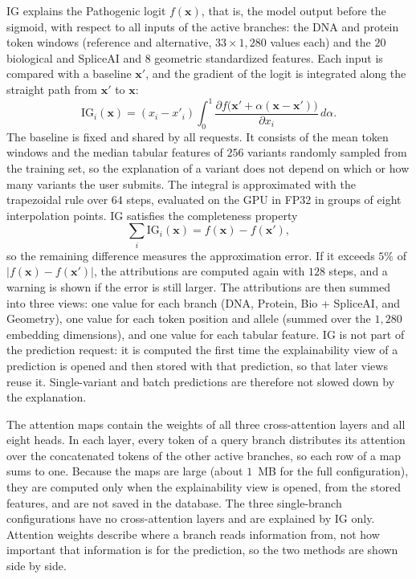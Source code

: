 IG explains the Pathogenic logit $f(\mathbf{x})$, that is, the model output before the sigmoid, with respect to all inputs of the active branches: the DNA and protein token windows (reference and alternative, $33 \times 1{,}280$ values each) and the $20$ biological and SpliceAI and $8$ geometric standardized features. Each input is compared with a baseline $\mathbf{x}'$, and the gradient of the logit is integrated along the straight path from $\mathbf{x}'$ to $\mathbf{x}$:
\[
    \mathrm{IG}_i(\mathbf{x}) = (x_i - x'_i) \int_{0}^{1} \frac{\partial f\big(\mathbf{x}' + \alpha (\mathbf{x} - \mathbf{x}')\big)}{\partial x_i}\, d\alpha .
\]
The baseline is fixed and shared by all requests. It consists of the mean token windows and the median tabular features of $256$ variants randomly sampled from the training set, so the explanation of a variant does not depend on which or how many variants the user submits. The integral is approximated with the trapezoidal rule over $64$ steps, evaluated on the GPU in FP32 in groups of eight interpolation points. IG satisfies the completeness property
\[
    \sum_{i} \mathrm{IG}_i(\mathbf{x}) = f(\mathbf{x}) - f(\mathbf{x}'),
\]
so the remaining difference measures the approximation error. If it exceeds $5\%$ of $|f(\mathbf{x}) - f(\mathbf{x}')|$, the attributions are computed again with $128$ steps, and a warning is shown if the error is still larger. The attributions are then summed into three views: one value for each branch (DNA, Protein, Bio + SpliceAI, and Geometry), one value for each token position and allele (summed over the $1{,}280$ embedding dimensions), and one value for each tabular feature. IG is not part of the prediction request: it is computed the first time the explainability view of a prediction is opened and then stored with that prediction, so that later views reuse it. Single-variant and batch predictions are therefore not slowed down by the explanation.

The attention maps contain the weights of all three cross-attention layers and all eight heads. In each layer, every token of a query branch distributes its attention over the concatenated tokens of the other active branches, so each row of a map sums to one. Because the maps are large (about $1$~MB for the full configuration), they are computed only when the explainability view is opened, from the stored features, and are not saved in the database. The three single-branch configurations have no cross-attention layers and are explained by IG only. Attention weights describe where a branch reads information from, not how important that information is for the prediction, so the two methods are shown side by side.

